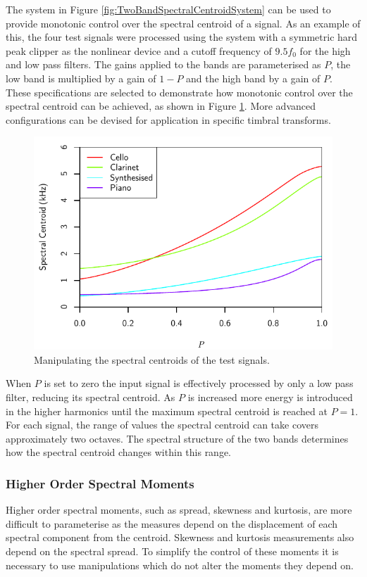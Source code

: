 			The system in Figure \ref{fig:TwoBandSpectralCentroidSystem} can be used to provide monotonic
			control over the spectral centroid of a signal. As an example of this, the four test signals were
			processed using the system with a symmetric hard peak clipper as the nonlinear device and a cutoff
			frequency of $9.5f_{0}$ for the high and low pass filters. The gains applied to the bands are
			parameterised as $P$, the low band is multiplied by a gain of $1 - P$ and the high band by a gain
			of $P$. These specifications are selected to demonstrate how monotonic control over the spectral
			centroid can be achieved, as shown in Figure \ref{fig:MoveCentroids}. More advanced configurations
			can be devised for application in specific timbral transforms.

			\begin{figure}[h!]
				\centering
				\includegraphics{chapter6/Images/MoveCentroids.pdf}
				\caption{Manipulating the spectral centroids of the test signals.}
				\label{fig:MoveCentroids}
			\end{figure}

			When $P$ is set to zero the input signal is effectively processed by only a low pass filter,
			reducing its spectral centroid. As $P$ is increased more energy is introduced in the higher
			harmonics until the maximum spectral centroid is reached at $P = 1$. For each signal, the range of
			values the spectral centroid can take covers approximately two octaves. The spectral structure of
			the two bands determines how the spectral centroid changes within this range.

		\subsubsection*{Higher Order Spectral Moments}
			Higher order spectral moments, such as spread, skewness and kurtosis, are more difficult to
			parameterise as the measures depend on the displacement of each spectral component from the
			centroid. Skewness and kurtosis measurements also depend on the spectral spread. To simplify the
			control of these moments it is necessary to use manipulations which do not alter the moments they
			depend on. 
			
